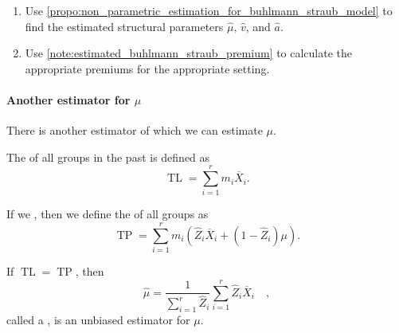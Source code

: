 \documentclass[notoc,notitlepage]{tufte-book}
\DeclareMathOperator{\TL}{TL}
\DeclareMathOperator{\TP}{TP}
\begin{document}
\begin{procedure}\label{procedure:finding_an_estimated_buhlmann_straub_premium}
  \begin{enumerate}
    \item Use \cref{propo:non_parametric_estimation_for_buhlmann_straub_model}
      to find the estimated structural parameters $\hat{\mu},\, \hat{v}$, and
      $\hat{a}$.
    \item Use \cref{note:estimated_buhlmann_straub_premium}
      to calculate the appropriate premiums for the appropriate setting.
  \end{enumerate}
\end{procedure}

\paragraph{Another estimator for $\mu$}
There is another estimator of which we can estimate $\mu$.

\begin{defn}\label{defn:total_loss_of_all_groups}
  The  of all groups in the past is defined as
  \begin{equation*}
    \TL = \sum_{i=1}^{r} m_i \overline{X}_i.
  \end{equation*}
\end{defn}

\begin{defn}\label{defn:total_premium_of_all_groups}
  If we , then we define
  the   of all groups as
  \begin{equation*}
    \TP = \sum_{i=1}^{r} m_i \left( \hat{Z}_i \overline{X}_i + (1 -
    \hat{Z}_i)\mu \right).
  \end{equation*}
\end{defn}

\begin{propo}\label{propo:credibility_weighted_average}
  If $\TL = \TP$, then
  \begin{equation*}
    \hat{\mu} = \frac{1}{\sum_{i=1}^{r} \hat{Z}_i}
      \sum_{i=1}^{r} \hat{Z}_i \overline{X}_i \quad,
  \end{equation*}
  called a ,
  is an unbiased estimator for $\mu$.
\end{propo}
\end{document}
